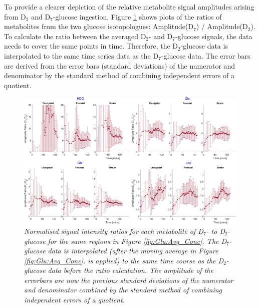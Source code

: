 \documentclass[class=article, crop=false]{standalone}
\begin{document}
To provide a clearer depiction of the relative metabolite signal amplitudes arising from D$_2$ and D$_7$-glucose ingestion, Figure \ref{fig:Glu:D7_D2} shows plots of the ratios of metabolites from the two glucose isotopologues: Amplitude(D$_7$) / Amplitude(D$_2$). To calculate the ratio between the averaged D$_2$- and D$_7$-glucose signals, the data needs to cover the same points in time. Therefore, the D$_2$-glucose data is interpolated to the same time series data as the D$_7$-glucose data. The error bars are derived from the error bars (standard deviations) of the numerator and denominator by the standard method of combining independent errors of a quotient. 

\begin{figure}
    \centering
    \includegraphics[width = 1\textwidth]{Figures/Glucose/D7_D2.png}
    \caption{\textit{Normalised signal intensity ratios for each metabolite of D$_7$- to D$_2$-glucose for the same regions in Figure \ref{fig:Glu:Avg_Conc}. The D$_7$-glucose data is interpolated (after the moving average in Figure \ref{fig:Glu:Avg_Conc}. is applied) to the same time course as the D$_2$-glucose data before the ratio calculation. The amplitude of the errorbars are now the previous standard deviations of the numerator and denominator combined by the standard method of combining independent errors of a quotient.}}
    \label{fig:Glu:D7_D2}
\end{figure}
\end{document}
